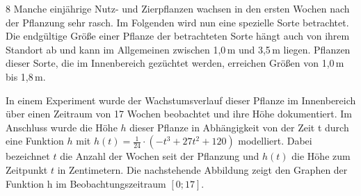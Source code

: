 \documentclass[a4paper,12pt]{article}
\begin{document}
\begin{langesbeispiel} \item[8]	%
Manche einjährige Nutz- und Zierpflanzen wachsen in den ersten Wochen nach der Pflanzung sehr rasch. Im Folgenden wird nun eine spezielle Sorte betrachtet. Die endgültige Größe einer
Pflanze der betrachteten Sorte hängt auch von ihrem Standort ab und kann im Allgemeinen zwischen 1,0\,m und 3,5\,m liegen. Pflanzen dieser Sorte, die im Innenbereich gezüchtet werden,
erreichen Größen von 1,0\,m bis 1,8\,m. 

In einem Experiment wurde der Wachstumsverlauf dieser Pflanze im Innenbereich über einen Zeitraum von 17 Wochen beobachtet und ihre Höhe dokumentiert. Im Anschluss wurde die
Höhe $h$ dieser Pflanze in Abhängigkeit von der Zeit t durch eine Funktion $h$ mit $h(t) = \frac{1}{24}\cdot \left(-t^3+27t^2+120\right)$ modelliert. Dabei bezeichnet $t$ die Anzahl der Wochen seit der Pflanzung und $h(t)$ die Höhe zum Zeitpunkt $t$ in Zentimetern. Die nachstehende Abbildung zeigt den Graphen der Funktion h im Beobachtungszeitraum $[0; 17]$.

\begin{center}
\end{center}%

\begin{aufgabenstellung}
\item %



\end{aufgabenstellung}
\end{langesbeispiel}
\end{document}
